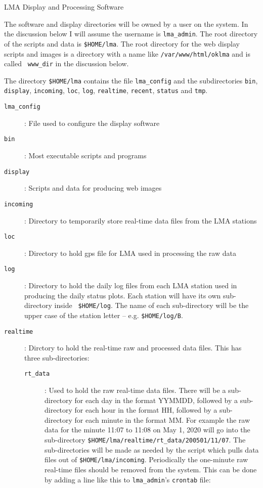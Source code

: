 \documentclass[12pt]{article}
\begin{document}
\begin{center}
LMA Display and Processing Software
\end{center}

The software and display directories will be owned by a user on the system.  In the
discussion below I will assume the username is {\tt lma\_admin}.  The root directory of the
scripts and data is {\tt \$HOME/lma}. The root directory for the web display scripts and
images is a directory with a name like {\tt /var/www/html/oklma} and is called {\tt
www\_dir} in the discussion below.


The directory {\tt \$HOME/lma} contains the file {\tt lma\_config} and the subdirectories
{\tt bin}, {\tt display}, {\tt incoming}, {\tt loc}, {\tt log}, {\tt realtime}, {\tt recent},
{\tt status} and {\tt tmp}.

\begin{description}
\item[{\tt lma\_config}]:  File used to configure the display software
\item[{\tt bin}]: Most executable scripts and programs
\item[{\tt display}]: Scripts and data for producing web images
\item[{\tt incoming}]: Directory to temporarily store real-time data files from the LMA
stations
\item[{\tt loc}]: Directory to hold gps file for LMA used in processing the raw data
\item[{\tt log}]: Directory to hold the daily log files from each LMA station used in
producing the daily status plots.  Each station will have its own sub-directory inside {\tt
\$HOME/log}.  The name of each sub-directory will be the upper case of the station letter --
e.g. {\tt \$HOME/log/B}.
\item[{\tt realtime}]: Dirctory to hold the real-time raw and processed data files.  This has
three sub-directories:
\begin{description}
\item [{\tt rt\_data}]:  Used to hold the raw real-time data files.  There will be a
sub-directory for each day in the format YYMMDD, followed by a sub-directory for each hour
in the format HH, followed by a sub-directory for each minute in the format MM. For example
the raw data for the minute 11:07 to 11:08 on May 1, 2020 will go into the sub-directory
{\tt \$HOME/lma/realtime/rt\_data/200501/11/07}.  The sub-directories will be made as needed
by the script which pulls data files out of {\tt \$HOME/lma/incoming}.  Periodically the
one-minute raw real-time files should be removed from the system.  This can be done by
adding a line like this to {\tt lma\_admin}'s {\tt crontab} file:


\end{description}
\end{description}
\end{document}
